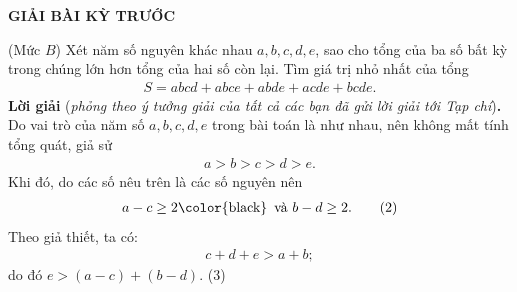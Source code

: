 \begin{center}
	{\large{\textbf{\color{thachthuctoanhoc}\color{thachthuctoanhoc}GIẢI BÀI KỲ TRƯỚC}}}
\end{center}
\begin{multicols}{2}
	\setlength{\abovedisplayskip}{4pt}
	\setlength{\belowdisplayskip}{4pt}
	{}
	(Mức $B$) Xét năm số nguyên khác nhau $a, b, c, d, e$, sao cho tổng của ba số bất kỳ trong chúng lớn hơn tổng của hai số còn lại. Tìm giá trị nhỏ nhất của tổng
	\begin{align*}
		S = abcd + abce + abde + acde + bcde.
	\end{align*}
	\textbf{\color{thachthuctoanhoc}Lời giải} (\textit{phỏng theo ý tưởng giải của tất cả các bạn đã gửi lời giải tới Tạp chí})\textbf{\color{thachthuctoanhoc}.}
	\vskip 0.05cm
	Do vai trò của năm số $a, b, c, d, e$ trong bài toán là như nhau, nên không mất tính tổng quát, giả sử
	\begin{align*}
		a > b > c > d > e.\tag{$1$}
	\end{align*}                                                             
	Khi đó, do các số nêu trên là các số nguyên nên
	\begin{align*}
		a - c \ge 2 \text{\color{black} \,và } b - d \ge 2. \tag{$2$}
	\end{align*}
	Theo giả thiết, ta có:
	\begin{align*}
		c+d+e > a+b;
	\end{align*}
	do đó \hspace*{25pt}$e >  (a - c) + (b - d).$ \hfill ($3$)
	\end{multicols}
